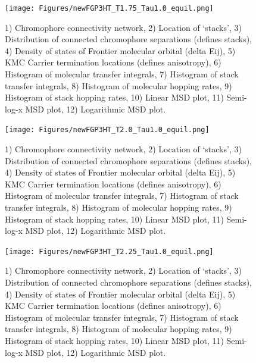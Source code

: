 \documentclass[12pt]{article}
\begin{document}
\begin{figure}[h]\centering
	\texttt{[image: Figures/newFGP3HT\_T1.75\_Tau1.0\_equil.png]}
    \caption{   1) Chromophore connectivity network, 
                2) Location of `stacks', 
                3) Distribution of connected chromophore separations (defines stacks),
                4) Density of states of Frontier molecular orbital (delta Eij),
                5) KMC Carrier termination locations (defines anisotropy),
                6) Histogram of molecular transfer integrals,
                7) Histogram of stack transfer integrals,
                8) Histogram of molecular hopping rates,
                9) Histogram of stack hopping rates,
                10) Linear MSD plot,
                11) Semi-log-x MSD plot,
                12) Logarithmic MSD plot.}
	\label{fig:T1.75}
\end{figure}


\begin{figure}[h]\centering
	\texttt{[image: Figures/newFGP3HT\_T2.0\_Tau1.0\_equil.png]}
    \caption{   1) Chromophore connectivity network, 
                2) Location of `stacks', 
                3) Distribution of connected chromophore separations (defines stacks),
                4) Density of states of Frontier molecular orbital (delta Eij),
                5) KMC Carrier termination locations (defines anisotropy),
                6) Histogram of molecular transfer integrals,
                7) Histogram of stack transfer integrals,
                8) Histogram of molecular hopping rates,
                9) Histogram of stack hopping rates,
                10) Linear MSD plot,
                11) Semi-log-x MSD plot,
                12) Logarithmic MSD plot.}
	\label{fig:T2.0}
\end{figure}


\begin{figure}[h]\centering
	\texttt{[image: Figures/newFGP3HT\_T2.25\_Tau1.0\_equil.png]}
    \caption{   1) Chromophore connectivity network, 
                2) Location of `stacks', 
                3) Distribution of connected chromophore separations (defines stacks),
                4) Density of states of Frontier molecular orbital (delta Eij),
                5) KMC Carrier termination locations (defines anisotropy),
                6) Histogram of molecular transfer integrals,
                7) Histogram of stack transfer integrals,
                8) Histogram of molecular hopping rates,
                9) Histogram of stack hopping rates,
                10) Linear MSD plot,
                11) Semi-log-x MSD plot,
                12) Logarithmic MSD plot.}
	\label{fig:T2.25}
\end{figure}
\end{document}
